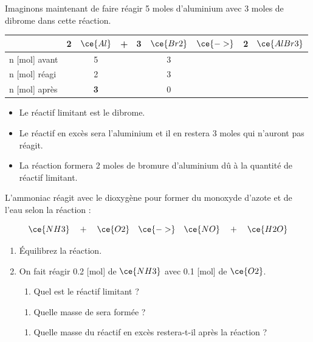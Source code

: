 \documentclass[
  11pt,
  french,
  a4paper,
  openany]{book}
\providecommand{\tightlist}{%
  \setlength{\itemsep}{0pt}\setlength{\parskip}{0pt}}
\begin{document}
Imaginons maintenant de faire réagir 5 moles d'aluminium avec 3 moles de dibrome dans cette réaction.

\begin{longtable}[]{@{}lcccccccc@{}}
\toprule
& 2 & \(\ce{Al}\) & + & 3 & \(\ce{Br2}\) & \(\ce{->}\) & 2 & \(\ce{AlBr3}\)\tabularnewline
\midrule
\endhead
n {[}mol{]} avant & & 5 & & & 3 & & &\tabularnewline
n {[}mol{]} réagi & & 2 & & & 3 & & &\tabularnewline
n {[}mol{]} après & & \textbf{3} & & & 0 & & &\tabularnewline
\bottomrule
\end{longtable}

\begin{itemize}
\tightlist
\item
  Le réactif limitant est le dibrome.
\item
  Le réactif en excès sera l'aluminium et il en restera 3 moles qui n'auront pas réagit.
\item
  La réaction formera 2 moles de bromure d'aluminium dû à la quantité de réactif limitant.
\end{itemize}

\begin{Exercise}

L'ammoniac réagit avec le dioxygène pour former du monoxyde d'azote et de l'eau selon la réaction :

\[ \ce{NH3} \quad + \quad \ce{O2} \quad \ce{->} \quad \ce{NO} \quad + \quad \ce{H2O} \]

\begin{enumerate}
\def\labelenumi{\arabic{enumi}.}
\item
  Équilibrez la réaction.
\item
  On fait réagir 0.2 {[}mol{]} de \(\ce{NH3}\) avec 0.1 {[}mol{]} de \(\ce{O2}\).

  \begin{enumerate}
  \def\labelenumii{\alph{enumii}.}
  \tightlist
  \item
    Quel est le réactif limitant ?
  \end{enumerate}


  \begin{enumerate}
  \def\labelenumii{\alph{enumii}.}
  \setcounter{enumii}{1}
  \tightlist
  \item
    Quelle masse de  sera formée ?
  \end{enumerate}


  \begin{enumerate}
  \def\labelenumii{\alph{enumii}.}
  \setcounter{enumii}{2}
  \tightlist
  \item
    Quelle masse du réactif en excès restera-t-il après la réaction ?
  \end{enumerate}

\end{enumerate}


\end{Exercise}
\end{document}
